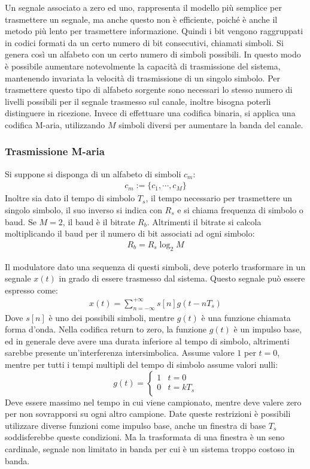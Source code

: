 \documentclass{article}
\numberwithin{equation}{subsection}
\begin{document}
Un segnale associato a zero ed uno, rappresenta il modello più semplice per trasmettere un segnale, ma anche questo non è efficiente, poiché è anche il metodo più lento per 
trasmettere informazione. Quindi i bit vengono raggruppati in codici formati da un certo numero di bit consecutivi, chiamati simboli. Si genera così un alfabeto con un 
certo numero di simboli possibili. In questo modo è possibile aumentare notevolmente la 
capacità di trasmissione del sistema, mantenendo invariata la velocità di trasmissione di un singolo simbolo.  
Per trasmettere questo tipo di alfabeto sorgente sono necessari lo stesso numero di livelli possibili per il segnale trasmesso sul canale, inoltre bisogna poterli distinguere 
in ricezione. 
Invece di effettuare una codifica binaria, si applica una codifica M-aria, utilizzando $M$ simboli diversi per aumentare la banda del canale. 

\subsubsection{Trasmissione M-aria}

Si suppone si disponga di un alfabeto di simboli $c_m$:
\begin{gather*}
    c_m:=\biggl\{c_1,\cdots,c_M\biggr\}
\end{gather*}
Inoltre sia dato il tempo di simbolo $T_s$, il tempo necessario per trasmettere un singolo simbolo, il suo inverso si indica con $R_s$ e si chiama frequenza di simbolo o 
baud. Se $M=2$, il baud è il bitrate $R_b$. Altrimenti il bitrate si calcola moltiplicando il baud per il numero di bit associati ad ogni simbolo:
\begin{gather*}
    R_b=R_s\log_{2}M
\end{gather*}

Il modulatore dato una sequenza di questi simboli, deve poterlo trasformare in un segnale $x(t)$ in grado di essere trasmesso dal sistema. 
Questo segnale può essere espresso come:
\begin{gather}
    x(t)=\displaystyle\sum_{n=-\infty}^{+\infty}s[n]g(t-nT_s)
\end{gather}
Dove $s[n]$ è uno dei possibili simboli, mentre $g(t)$ è una funzione chiamata forma d'onda. 
Nella codifica return to zero, la funzione $g(t)$ è un impulso base, ed in generale deve avere una durata inferiore al tempo di simbolo, altrimenti sarebbe presente un'interferenza 
intersimbolica. Assume valore $1$ per $t=0$, mentre per tutti i tempi multipli del tempo di simbolo assume valori nulli:
\begin{equation}
    g(t)=\begin{cases}
        1&t=0\\
        0&t=kT_s
    \end{cases}
\end{equation}
Deve essere massimo nel tempo in cui viene campionato, mentre deve valere zero per non sovrapporsi su ogni altro campione. Date queste restrizioni è possibili utilizzare 
diverse funzioni come impulso base, anche un finestra di base $T_s$ soddisferebbe queste condizioni. Ma la trasformata di una finestra è un seno cardinale, 
segnale non limitato in banda per cui è un sistema troppo costoso in banda. 
\end{document}
